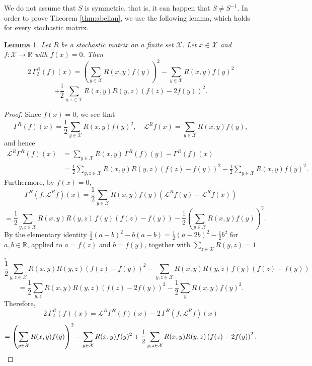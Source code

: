 \documentclass[a4paper, reqno, 11pt]{amsart}
\newtheorem{Lem}[Thm]{Lemma}
\theoremstyle{definition}
\begin{document}
We do not assume that $S$ is symmetric, that is, it can happen that $S \ne S^{-1}$. 
In order to prove Theorem \ref{thm:abelian}, we use the following lemma, which holds for every stochastic matrix.

\begin{Lem}\label{lem:gamma2-formula}
Let $R$ be a stochastic matrix on a finite set $\mathcal{X}$.
Let $x \in \mathcal{X}$ and $f \colon \mathcal{X} \to \mathbb{R}$ with $f(x) = 0$.
Then
\[ 2\,\Gamma_{2}^{R}(f)(x) = \left(\sum_{y \in \mathcal{X}} R(x,y) f(y)\right)^{2} - \sum_{y \in \mathcal{X}} R(x,y) f(y)^{2} \]
\[ + \frac{1}{2} \sum_{y, z \in \mathcal{X}} R(x,y) R(y,z) \left(f(z) - 2f(y)\right)^{2}. \]
\end{Lem}

\begin{proof}
Since $f(x) = 0$, we see that
\[ \Gamma^{R}(f)(x) = \frac{1}{2} \sum_{y \in \mathcal{X}} R(x,y) f(y)^{2}, \quad \mathcal{L}^{R} f(x) = \sum_{y \in \mathcal{X}} R(x,y) f(y), \]
and hence
\begin{align*} 
\mathcal{L}^{R}\Gamma^{R}(f)(x) &= \sum_{y \in \mathcal{X}} R(x,y)\,\Gamma^{R}(f)(y) - \Gamma^{R}(f)(x) \\
&= \frac{1}{2} \sum_{y, z \in \mathcal{X}} R(x,y) R(y,z) \left(f(z) - f(y)\right)^{2} - \frac{1}{2} \sum_{y \in \mathcal{X}} R(x,y) f(y)^{2}. 
\end{align*}
Furthermore, by $f(x) = 0$,
\[ \Gamma^{R}(f, \mathcal{L}^{R} f)(x) = \frac{1}{2} \sum_{y \in \mathcal{X}} R(x,y) f(y) \left(\mathcal{L}^{R} f(y) - \mathcal{L}^{R} f(x)\right) \]
\[ = \frac{1}{2} \sum_{y, z \in \mathcal{X}} R(x,y) R(y,z)\, f(y) \left(f(z) - f(y)\right) - \frac{1}{2} \left(\sum_{y \in \mathcal{X}} R(x,y) f(y)\right)^{2}. \]
By the elementary identity
$\frac{1}{2}(a - b)^{2} - b(a - b) = \frac{1}{2}(a - 2b)^{2} - \frac{1}{2} b^{2}$ for $a, b \in \mathbb{R}$,
applied to $a = f(z)$ and $b = f(y)$, together with $\sum_{z \in \mathcal{X}} R(y,z) = 1$,
\[ \frac{1}{2} \sum_{y, z \in \mathcal{X}} R(x,y) R(y,z) \left(f(z) - f(y)\right)^{2} - \sum_{y, z \in \mathcal{X}} R(x,y) R(y,z)\, f(y) \left(f(z) - f(y)\right) \]
\[ = \frac{1}{2} \sum_{y, z} R(x,y) R(y,z) \left(f(z) - 2f(y)\right)^{2} - \frac{1}{2} \sum_{y} R(x,y) f(y)^{2}. \]
Therefore,
\[ 2\,\Gamma_{2}^{R}(f)(x) = \mathcal{L}^{R}\Gamma^{R}(f)(x) - 2\,\Gamma^{R}(f, \mathcal{L}^{R} f)(x) \]
\[ = \left(\sum_{y \in \mathcal{X}} R(x,y) f(y)\right)^{2} - \sum_{y \in \mathcal{X}} R(x,y) f(y)^{2}  + \frac{1}{2} \sum_{y, z \in \mathcal{X}} R(x,y) R(y,z) \left(f(z) - 2f(y)\right)^{2}. \qedhere \]
\end{proof}
\end{document}
